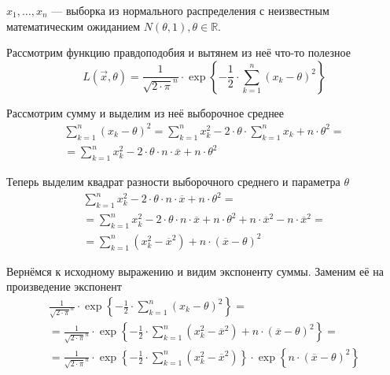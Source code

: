 \begin{example}
  $x_1, \dots, x_n$ --- выборка из нормального распределения с неизвестным
  математическим ожиданием $N\left( \theta, 1 \right), \theta \in \mathbb{R}$.

  Рассмотрим функцию правдоподобия и вытянем из неё что-то полезное
  $$L\left( \vec{x}, \theta \right)
      = \frac{1}{\sqrt{2 \cdot \pi}^n}
      \cdot \exp{\left\{ -\frac{1}{2}
      \cdot \sum_{k=1}^n \left( x_k - \theta \right)^2 \right\}}$$

  Рассмотрим сумму и выделим из неё выборочное среднее
  \begin{align*}
      \sum_{k=1}^n \left( x_k - \theta \right)^2
      = \sum_{k=1}^n x_k^2 - 2 \cdot \theta \cdot \sum_{k=1}^n x_k
      + n \cdot \theta^2 = \\
      = \sum_{k=1}^n x_k^2 - 2 \cdot \theta \cdot n \cdot \overline{x}
      + n \cdot \theta^2
  \end{align*}

  Теперь выделим квадрат разности выборочного среднего и параметра $\theta$
  \begin{align*}
      \sum_{k=1}^n x_k^2 - 2 \cdot \theta \cdot n \cdot \overline{x}
      + n \cdot \theta^2 = \\
      = \sum_{k=1}^n x_k^2 - 2 \cdot \theta \cdot n \cdot \overline{x}
      + n \cdot \theta^2 + n \cdot \overline{x}^2
      - n \cdot \overline{x}^2 = \\
      = \sum_{k=1}^n \left( x_k^2 - \overline{x}^2 \right)
      + n \cdot \left( \overline{x} - \theta \right)^2
  \end{align*}

  Вернёмся к исходному выражению и видим экспоненту суммы.
  Заменим её на произведение экспонент
  \begin{align*}
      \frac{1}{\sqrt{2 \cdot \pi}^n} \cdot \exp{\left\{ -\frac{1}{2}
      \cdot \sum_{k=1}^n \left( x_k - \theta \right)^2 \right\}} = \\
      = \frac{1}{\sqrt{2 \cdot \pi}^n} \cdot \exp{\left\{ -\frac{1}{2}
      \cdot \sum_{k=1}^n \left( x_k^2 - \overline{x}^2 \right)
    + n \cdot \left( \overline{x} - \theta \right)^2
    \right\}} = \\
      = \frac{1}{\sqrt{2 \cdot \pi}^n}
      \cdot \exp{\left\{ -\frac{1}{2}
    \cdot \sum_{k=1}^n \left( x_k^2 - \overline{x}^2 \right)
        \right\}}
      \cdot \exp{\left\{ n \cdot \left( \overline{x}
    - \theta \right)^2 \right\}}
  \end{align*}


\end{example}
